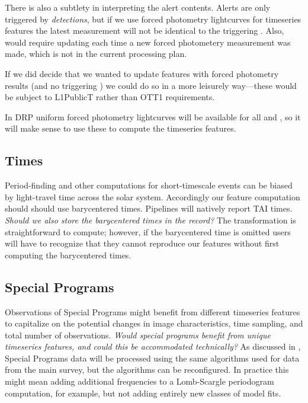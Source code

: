 \documentclass[DM,authoryear,toc]{lsstdoc}
\begin{document}
There is also a subtlety in interpreting the alert contents.
Alerts are only triggered by \DIASource \textit{detections}, but if we use forced photometry lightcurves for timeseries features the latest measurement will not be identical to the triggering \DIASource.
Also, \DIAObjects would require updating each time a new forced photometery measurement was made, which is not in the current processing plan.

If we did decide that we wanted to update \DIAObject features with forced photometry results (and no triggering \DIASource) we could do so in a more leisurely way---these would be subject to L1PublicT rather than OTT1 requirements.

In DRP uniform forced photometry lightcurves will be available for all \Objects and \DIAObjects, so it will make sense to use these to compute the timeseries features.

\subsection{Times}

Period-finding and other computations for short-timescale events can be biased by light-travel time across the solar system.
Accordingly our feature computation should should use barycentered times.
Pipelines will natively report TAI times.
\textit{Should we also store the barycentered times in the \DIASource record?}
The transformation is straightforward to compute; however, if the barycentered time is omitted users will have to recognize that they cannot reproduce our features without first computing the barycentered times.

\subsection{Special Programs}

Observations of Special Programs might benefit from different timeseries features to capitalize on the potential changes in image characteristics, time sampling, and total number of observations.
\textit{Would special programs benefit from unique timeseries features, and could this be accommodated technically?}
As discussed in , Special Programs data will be processed using the same algorithms used for data from the main survey, but the algorithms can be reconfigured.
In practice this might mean adding additional frequencies to a Lomb-Scargle periodogram computation, for example, but not adding entirely new classes of model fits.
\end{document}
